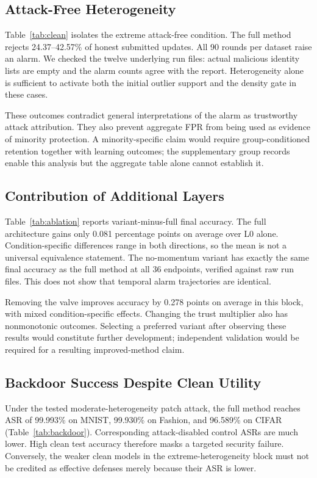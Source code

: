 \documentclass[journal]{IEEEtran}
\begin{document}
\subsection{Attack-Free Heterogeneity}
Table~\ref{tab:clean} isolates the extreme attack-free condition. The full method rejects 24.37--42.57\% of honest submitted updates. All 90 rounds per dataset raise an alarm. We checked the twelve underlying run files: actual malicious identity lists are empty and the alarm counts agree with the report. Heterogeneity alone is sufficient to activate both the initial outlier support and the density gate in these cases.


These outcomes contradict general interpretations of the alarm as trustworthy attack attribution. They also prevent aggregate FPR from being used as evidence of minority protection. A minority-specific claim would require group-conditioned retention together with learning outcomes; the supplementary group records enable this analysis but the aggregate table alone cannot establish it.

\subsection{Contribution of Additional Layers}
Table~\ref{tab:ablation} reports variant-minus-full final accuracy. The full architecture gains only 0.081 percentage points on average over L0 alone. Condition-specific differences range in both directions, so the mean is not a universal equivalence statement. The no-momentum variant has exactly the same final accuracy as the full method at all 36 endpoints, verified against raw run files. This does not show that temporal alarm trajectories are identical.


Removing the valve improves accuracy by 0.278 points on average in this block, with mixed condition-specific effects. Changing the trust multiplier also has nonmonotonic outcomes. Selecting a preferred variant after observing these results would constitute further development; independent validation would be required for a resulting improved-method claim.

\subsection{Backdoor Success Despite Clean Utility}
Under the tested moderate-heterogeneity patch attack, the full method reaches ASR of 99.993\% on MNIST, 99.930\% on Fashion, and 96.589\% on CIFAR (Table~\ref{tab:backdoor}). Corresponding attack-disabled control ASRs are much lower. High clean test accuracy therefore masks a targeted security failure. Conversely, the weaker clean models in the extreme-heterogeneity block must not be credited as effective defenses merely because their ASR is lower.

\end{document}
